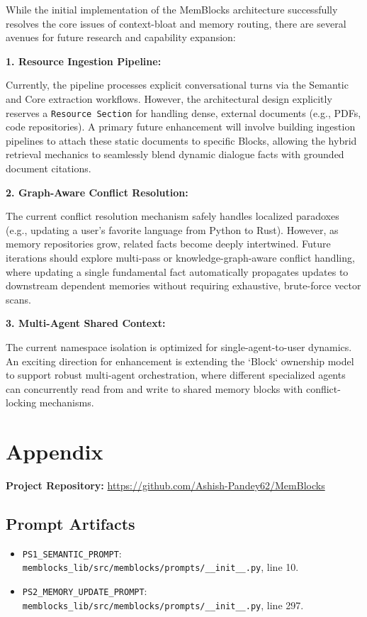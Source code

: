 \documentclass[12pt,a4paper]{article}
\begin{document}
While the initial implementation of the MemBlocks architecture successfully resolves the core issues of context-bloat and memory routing, there are several avenues for future research and capability expansion:

\textbf{1. Resource Ingestion Pipeline:}\par
Currently, the pipeline processes explicit conversational turns via the Semantic and Core extraction workflows. However, the architectural design explicitly reserves a \texttt{Resource Section} for handling dense, external documents (e.g., PDFs, code repositories). A primary future enhancement will involve building ingestion pipelines to attach these static documents to specific Blocks, allowing the hybrid retrieval mechanics to seamlessly blend dynamic dialogue facts with grounded document citations.

\textbf{2. Graph-Aware Conflict Resolution:}\par
The current conflict resolution mechanism safely handles localized paradoxes (e.g., updating a user's favorite language from Python to Rust). However, as memory repositories grow, related facts become deeply intertwined. Future iterations should explore multi-pass or knowledge-graph-aware conflict handling, where updating a single fundamental fact automatically propagates updates to downstream dependent memories without requiring exhaustive, brute-force vector scans.

\textbf{3. Multi-Agent Shared Context:}\par
The current namespace isolation is optimized for single-agent-to-user dynamics. An exciting direction for enhancement is extending the `Block` ownership model to support robust multi-agent orchestration, where different specialized agents can concurrently read from and write to shared memory blocks with conflict-locking mechanisms.

\section{Appendix}

\textbf{Project Repository:} \url{https://github.com/Ashish-Pandey62/MemBlocks}

\subsection{Prompt Artifacts}

\begin{itemize}
    \item \texttt{PS1\_SEMANTIC\_PROMPT}: \texttt{memblocks\_lib/src/memblocks/prompts/\_\_init\_\_.py}, line 10.
    \item \texttt{PS2\_MEMORY\_UPDATE\_PROMPT}: \texttt{memblocks\_lib/src/memblocks/prompts/\_\_init\_\_.py}, line 297.
\end{itemize}
\end{document}
